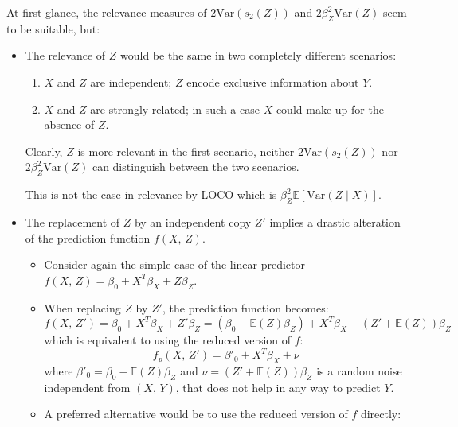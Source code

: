 At first glance, the relevance measures of $2\text{Var}(s_2(Z))$ and $2\beta_Z^2 \text{Var}(Z)$
seem to be suitable, but:
\begin{itemize}
    \item The relevance of $Z$ would be the same in two completely different scenarios:
        \begin{enumerate}
            \item $X$ and $Z$ are independent; $Z$ encode exclusive information about $Y$.
            \item $X$ and $Z$ are strongly related; in such a case $X$ could make up for the
                absence of $Z$.
        \end{enumerate}
        Clearly, $Z$ is more relevant in the first scenario, neither
        $2\text{Var}(s_2(Z))$ nor $2\beta_Z^2 \text{Var}(Z)$ can distinguish between the two scenarios.
        \begin{note}
            This is not the case in relevance by LOCO which
            is $\beta_Z^2 \mathds{E} \left[ \text{Var}(Z \mid X)\right]$.
        \end{note}
    \item The replacement of $Z$ by an independent copy $Z'$ implies a drastic alteration
        of the prediction function $f(X,\,Z)$.
        \begin{itemize}
            \item Consider again the simple case of the linear predictor
                $f(X,\,Z) = \beta_0 + X^T\beta_X + Z\beta_Z$.
            \item When replacing $Z$ by $Z'$, the prediction function becomes:
                \begin{equation*}
                    f(X,\,Z') = \beta_0 + X^T\beta_X + Z'\beta_Z =
                        (\beta_0 - \mathds{E}(Z)\beta_Z) + X^T\beta_X + (Z' + \mathds{E}(Z))\beta_Z
                \end{equation*}
                which is equivalent to using the reduced version of $f$:
                \begin{equation*}
                    f_p(X,\,Z') = \beta'_0 + X^T\beta_X + \nu
                \end{equation*}
                where $\beta'_0 = \beta_0 - \mathds{E}(Z)\beta_Z$ and $\nu = (Z' + \mathds{E}(Z))\beta_Z$ is
                a random noise independent from $(X,\,Y)$, that does not help in any way to predict $Y$.
            \item A preferred alternative would be to use the reduced version of $f$ directly:

\end{itemize}
\end{itemize}
